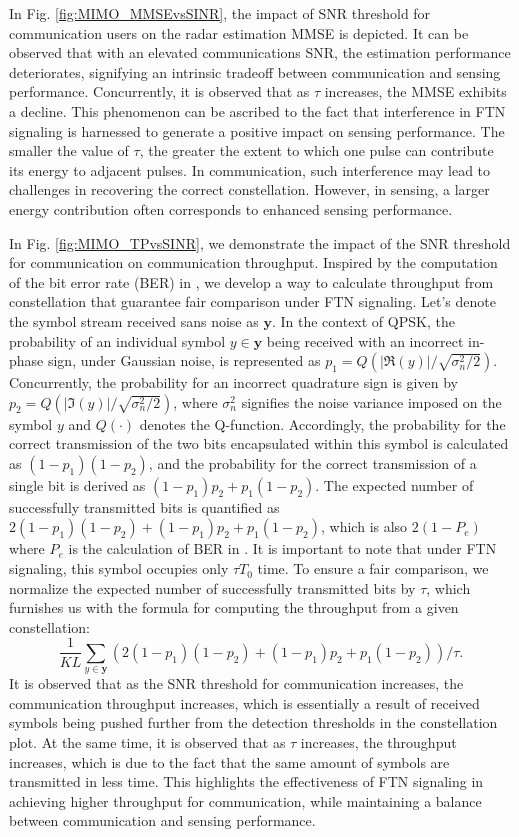 \documentclass[lettersize,journal]{IEEEtran}
\newcommand{\nocolor}[1]{{\color{black}#1}}
\begin{document}
In Fig. \ref{fig:MIMO_MMSEvsSINR}, the impact of SNR threshold for communication users on the radar estimation MMSE is depicted. It can be observed that with an elevated communications SNR, the estimation performance deteriorates, signifying an intrinsic tradeoff between communication and sensing performance.
Concurrently, it is observed that as $\tau$ increases, the MMSE exhibits a decline. This phenomenon can be ascribed to the fact that interference in FTN signaling is harnessed to generate a positive impact on sensing performance. The smaller the value of $\tau$, the greater the extent to which one pulse can contribute its energy to adjacent pulses. In communication, such interference may lead to challenges in recovering the correct constellation. However, in sensing, a larger energy contribution often corresponds to enhanced sensing performance.

In Fig. \ref{fig:MIMO_TPvsSINR}, we demonstrate the impact of the SNR threshold for communication on communication throughput. \nocolor{Inspired by the computation of the bit error rate (BER) in \cite{vitthaladevuni2001ber}, we develop a way to calculate throughput from constellation that guarantee fair comparison under FTN signaling. Let's denote the symbol stream received sans noise as $\mathbf{y}$. In the context of QPSK, the probability of an individual symbol $y \in \mathbf{y}$ being received with an incorrect in-phase sign, under Gaussian noise, is represented as $p_1=Q(|\Re(y)|/\sqrt{\sigma_n^2/2})$. Concurrently, the probability for an incorrect quadrature sign is given by $p_2=Q(|\Im(y)|/\sqrt{\sigma_n^2/2})$, where $\sigma_n^2$ signifies the noise variance imposed on the symbol $y$ and $Q(\cdot)$ denotes the Q-function.
Accordingly, the probability for the correct transmission of the two bits encapsulated within this symbol is calculated as $(1-p_1)(1-p_2)$, and the probability for the correct transmission of a single bit is derived as $(1-p_1)p_2+p_1(1-p_2)$. 
The expected number of successfully transmitted bits is quantified as $2(1-p_1)(1-p_2)+(1-p_1)p_2+p_1(1-p_2)$, which is also $2(1-P_e)$ where $P_e$ is the calculation of BER in \cite{vitthaladevuni2001ber}. It is important to note that under FTN signaling, this symbol occupies only $\tau T_0$ time. To ensure a fair comparison, we normalize the expected number of successfully transmitted bits by $\tau$, which furnishes us with the formula for computing the throughput from a given constellation:
$$\frac{1}{KL}\sum_{y\in\mathbf{y}}\left(2(1-p_1)(1-p_2)+(1-p_1)p_2+p_1(1-p_2)\right)/\tau.$$}
It is observed that as the SNR threshold for communication increases, the communication throughput increases, which is essentially a result of received symbols being pushed further from the detection thresholds in the constellation plot.
At the same time, it is observed that as $\tau$ increases, the throughput increases, which is due to the fact that the same amount of symbols are transmitted in less time. This highlights the effectiveness of FTN signaling in achieving higher throughput for communication, while maintaining a balance between communication and sensing performance.
\end{document}

